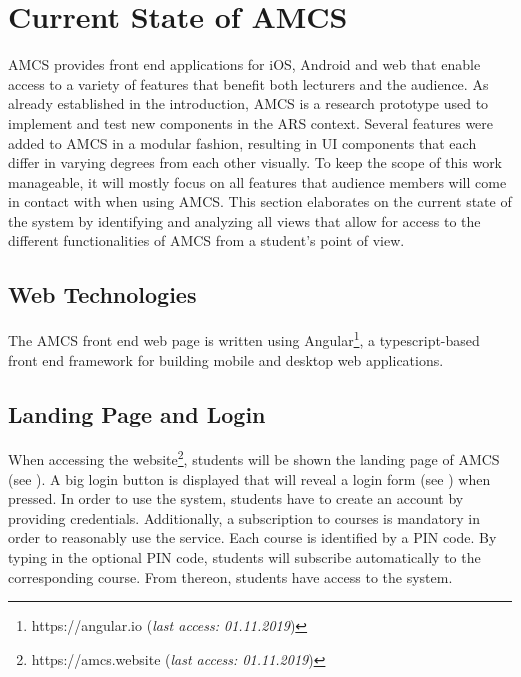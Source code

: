\chapter{Current State of AMCS}
\label{chapter:stateoftheart}
AMCS provides front end applications for iOS, Android and web that enable access to a variety of features that benefit both lecturers and the audience.
As already established in the introduction, AMCS is a research prototype used to implement and test new components in the ARS context.
Several features were added to AMCS in a modular fashion, resulting in UI components that each differ in varying degrees from each other visually. 
To keep the scope of this work manageable, it will mostly focus on all features that audience members will come in contact with when using AMCS.  
This section elaborates on the current state of the system by identifying and analyzing all views that allow for access to the different functionalities of AMCS from a student's point of view. 

\section{Web Technologies}
The AMCS front end web page is written using Angular\footnote{https://angular.io (\emph{last access: 01.11.2019})}, a typescript-based front end framework for building mobile and desktop web applications.

\section{Landing Page and Login}
\label{section:landingpage}
When accessing the website\footnote{https://amcs.website (\emph{last access: 01.11.2019})}, students will be shown the landing page of AMCS (see ). A big login button is displayed that will reveal a login form (see ) when pressed.
In order to use the system, students have to create an account by providing credentials.
\newline
\newline
Additionally, a subscription to courses is mandatory in order to reasonably use the service. Each course is identified by a PIN code. By typing in the optional PIN code, students will subscribe automatically to the corresponding course. From thereon, students have access to the system. 
 
